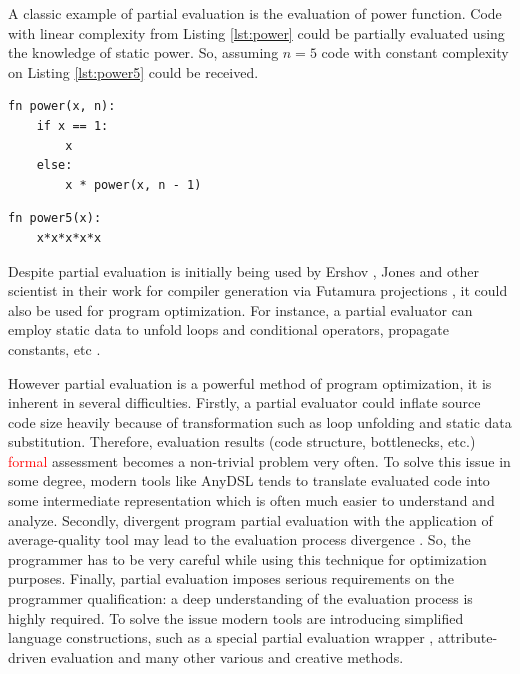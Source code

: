 \documentclass[conference]{IEEEtran}
\begin{document}
A classic example of partial evaluation is the evaluation of power function. Code with linear complexity from Listing \ref{lst:power} could be partially evaluated using the knowledge of static power. So, assuming $n = 5$ code with constant complexity on Listing \ref{lst:power5} could be received.

\begin{lstlisting}[caption={Power function before evaluation},label={lst:power}]
fn power(x, n):
	if x == 1:
		x
	else:
		x * power(x, n - 1)
\end{lstlisting}

\begin{lstlisting}[caption={Power function partially evaluation using n = 5},label={lst:power5}]
fn power5(x):
	x*x*x*x*x
\end{lstlisting}


Despite partial evaluation is initially being used by Ershov \cite{ershov1982mixed}, Jones \cite{jones1993partial} and other scientist in their work for compiler generation via Futamura projections \cite{futamura1983partial}, it could also be used for program optimization. For instance, a partial evaluator can employ static data to unfold loops and conditional operators, propagate constants, etc \cite{jones1993partial}. 

However partial evaluation is a powerful method of program optimization, it is inherent in several difficulties. Firstly, a partial evaluator could inflate source code size heavily because of transformation such as loop unfolding and static data substitution. Therefore, evaluation results (code structure, bottlenecks, etc.) \textcolor{red}{formal} assessment becomes a non-trivial problem very often. To solve this issue in some degree, modern tools like AnyDSL \cite{leissa2018anydsl} tends to translate evaluated code into some intermediate representation which is often much easier to understand and analyze. Secondly, divergent program partial evaluation with the application of average-quality tool may lead to the evaluation process divergence \cite{jones1993partial}. So, the programmer has to be very careful while using this technique for optimization purposes. Finally, partial evaluation imposes serious requirements on the programmer qualification: a deep understanding of the evaluation process is highly required. To solve the issue modern tools are introducing simplified language constructions, such as a special partial evaluation wrapper \cite{leissa2018anydsl}, attribute-driven evaluation \cite{10.1007/978-3-319-74313-4_27} and many other various and creative methods.
\end{document}
